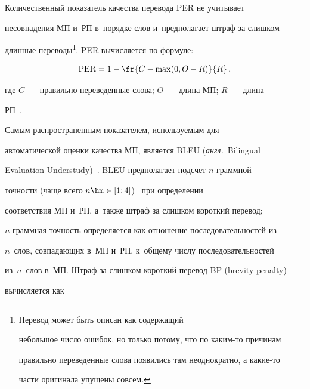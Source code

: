   Количественный показатель качества перевода PER не учитывает 

несовпадения МП и~РП в~порядке слов и~предполагает штраф за слишком 

длинные переводы\footnote{Перевод может быть описан как содержащий 

небольшое число ошибок, но только потому, что по каким-то причинам 

правильно переведенные слова появились там неоднократно, а ка\-кие-то 

части оригинала упущены совсем.}. PER вычисляется по формуле:



\vspace*{2.5pt}



\noindent

  $$

  \mathrm{PER}= 1-\fr{C-\max(0,O-R)}{R}\,,

  $$

  

  \vspace*{-2.5pt}

  

  \noindent

где $C$~--- правильно переведенные слова; $O$~--- длина МП; $R$~--- длина 

РП~\cite{22-r}.

  

  Самым распространенным показателем, используемым для 

автоматической оценки качества МП, является BLEU (\textit{англ.}\ Bilingual 

Evaluation Understudy)~\cite{23-r}. BLEU предполагает подсчет $n$-грам\-мной 

точ\-ности (чаще всего $n\hm\in [1;4]$)~\cite{22-r} при определении 

соответствия МП и~РП, а~также штраф за слишком короткий перевод;  

$n$-грам\-мная точность определяется как отношение последовательностей из 

$n$~слов, совпадающих в~МП и~РП, к~общему числу последовательностей 

из~$n$~слов в~МП. Штраф за слишком короткий перевод BP (brevity penalty) 

вычисляется как



\vspace*{-0.46729pt}



